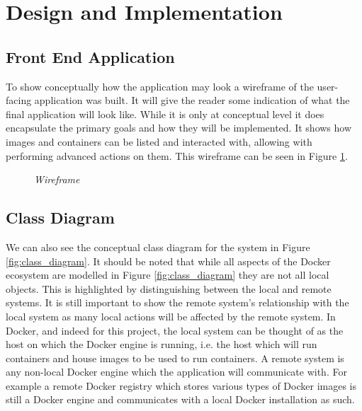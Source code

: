 \section{Design and Implementation}

\subsection{Front End Application}

To show conceptually how the application may look a wireframe of the user-facing application was built. It will give the reader some indication of what the final application will look like. While it is only at conceptual level it does encapsulate the primary goals and how they will be implemented. It shows how images and containers can be listed and interacted with, allowing with performing advanced actions on them. This wireframe can be seen in Figure \ref{fig:wireframe}.
\begin{figure}[!ht]
\centering
{}
\caption{\em Wireframe}
\label{fig:wireframe}
\end{figure}

\subsection{Class Diagram}
We can also see the conceptual class diagram for the system in Figure \ref{fig:class_diagram}. It should be noted that while all aspects of the Docker ecosystem are modelled in Figure \ref{fig:class_diagram} they are not all local objects. This is highlighted by distinguishing between the local and remote systems. It is still important to show the remote system's relationship with the local system as many local actions will be affected by the remote system. In Docker, and indeed for this project, the local system can be thought of as the host on which the Docker engine is running, i.e. the host which will run containers and house images to be used to run containers. A remote system is any non-local Docker engine which the application will communicate with. For example a remote Docker registry which stores various types of Docker images is still a Docker engine and communicates with a local Docker installation as such.

